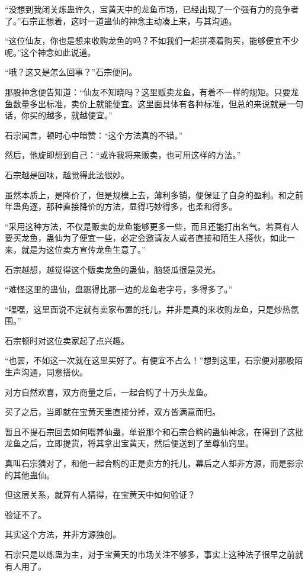 \begin{this_body}
“没想到我闭关炼蛊许久，宝黄天中的龙鱼市场，已经出现了一个强有力的竞争者了。”石宗正想着，这时一道蛊仙的神念主动凑上来，与其沟通。

“这位仙友，你也是想来收购龙鱼的吗？不如我们一起拼凑着购买，能够便宜不少呢。”这个神念如此说道。

“哦？这又是怎么回事？”石宗便问。

那股神念便告知道：“仙友不知晓吗？这里贩卖龙鱼，有着不一样的规矩。只要龙鱼数量多出标准，卖价上就能便宜。这里面具体有各种标准，但总的来说就是一句话，你买的越多，就越便宜。”

石宗闻言，顿时心中暗赞：“这个方法真的不错。”

然后，他旋即想到自己：“或许我将来贩卖，也可用这样的方法。”

石宗越是回味，越觉得此法很妙。

虽然本质上，是降价了，但是规模上去，薄利多销，便保证了自身的盈利。和之前年蛊角逐，那种直接降价的方法，显得巧妙得多，也柔和得多。

“采用这种方法，不仅是贩卖的龙鱼能够更多一些，而且还能打出名气。若真有人要买龙鱼，蛊仙为了便宜一些，必定会邀请友人或者直接和陌生人搭伙，如此一来，就是为这位卖方宣传龙鱼生意了。”

石宗越想，越觉得这个贩卖龙鱼的蛊仙，脑袋瓜很是灵光。

“难怪这里的蛊仙，盘踞得比那一边的龙鱼老字号，多得多了。”

“嘿嘿，这里面说不定就有卖家布置的托儿，并非是真的来收购龙鱼，只是炒热氛围。”

石宗顿时对这位卖家起了点兴趣。

“也罢，不如这一次就在这里买好了。有便宜不占么！”想到这里，石宗便对那股陌生声沟通，同意搭伙。

对方自然欢喜，双方商量之后，一起合购了十万头龙鱼。

买了之后，当即就在宝黄天里直接分掉，双方皆满意而归。

暂且不提石宗回去如何喂养仙蛊，单说那个和石宗合购的蛊仙神念，在得到了这批龙鱼之后，立即提货，将其拿出宝黄天，然后便送到了至尊仙窍里。

真叫石宗猜对了，和他一起合购的正是卖方的托儿，幕后之人却非方源，而是影宗的其他蛊仙。

但这层关系，就算有人猜得，在宝黄天中如何验证？

验证不了。

其实这个方法，并非方源独创。

石宗只是以炼蛊为主，对于宝黄天的市场关注不够多，事实上这种法子很早之前就有人用了。


\end{this_body}
